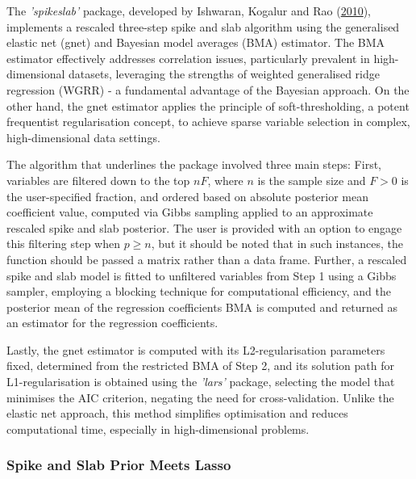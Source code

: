\documentclass[
  11pt,
]{article}
\begin{document}
The \emph{'spikeslab'} package, developed by Ishwaran, Kogalur and Rao
(\protect\hyperlink{ref-Ishwaran2010}{2010}), implements a rescaled
three-step spike and slab algorithm using the generalised elastic net
(gnet) and Bayesian model averages (BMA) estimator. The BMA estimator
effectively addresses correlation issues, particularly prevalent in
high-dimensional datasets, leveraging the strengths of weighted
generalised ridge regression (WGRR) - a fundamental advantage of the
Bayesian approach. On the other hand, the gnet estimator applies the
principle of soft-thresholding, a potent frequentist regularisation
concept, to achieve sparse variable selection in complex,
high-dimensional data settings.

The algorithm that underlines the package involved three main steps:
First, variables are filtered down to the top \(nF\), where \(n\) is the
sample size and \(F > 0\) is the user-specified fraction, and ordered
based on absolute posterior mean coefficient value, computed via Gibbs
sampling applied to an approximate rescaled spike and slab posterior.
The user is provided with an option to engage this filtering step when
\(p \geq n\), but it should be noted that in such instances, the
function should be passed a matrix rather than a data frame. Further, a
rescaled spike and slab model is fitted to unfiltered variables from
Step 1 using a Gibbs sampler, employing a blocking technique for
computational efficiency, and the posterior mean of the regression
coefficients BMA is computed and returned as an estimator for the
regression coefficients.

Lastly, the gnet estimator is computed with its L2-regularisation
parameters fixed, determined from the restricted BMA of Step 2, and its
solution path for L1-regularisation is obtained using the \emph{'lars'}
package, selecting the model that minimises the AIC criterion, negating
the need for cross-validation. Unlike the elastic net approach, this
method simplifies optimisation and reduces computational time,
especially in high-dimensional problems.

\subsubsection{Spike and Slab Prior Meets Lasso}
\end{document}
